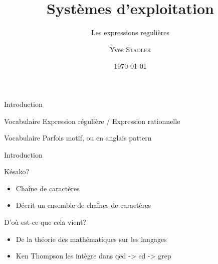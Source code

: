 
\title{Systèmes d'exploitation}
\subtitle{Les expressions regulières}

\author{Yves \textsc{Stadler}}

\date{\today}




\begin{frame}
\titlepage
\end{frame}

\def\sectitle{Introduction}
\def\subsectitle{Vocabulaire}

\begin{frame}{\sectitle}
\begin{block}{\subsectitle}
Expression régulière / Expression rationnelle
\end{block}

\begin{block}{\subsectitle}
Parfois motif, ou en anglais pattern
\end{block}

\end{frame}



\def\subsectitle{Késako?}
\begin{frame}{\sectitle}
\begin{block}{\subsectitle}
\begin{itemize}
\item Chaîne de caractères
\item Décrit un ensemble de chaînes de caractères
\end{itemize}
\end{block}


\def\subsectitle{D'où est-ce que cela vient?}
\begin{block}{\subsectitle}
\begin{itemize}
\item De la théorie des mathématiques sur les langages
\item Ken Thompson les intègre dans qed -> ed -> grep
\end{itemize}
\end{block}
\end{frame}



